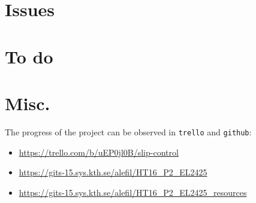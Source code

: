 \documentclass[oneside,12pt]{article}
\begin{document}
\section{Issues}



\section{To do}


\section{Misc.}

The progress of the project can be observed in \texttt{trello} and \texttt{github}:

\begin{itemize}
  \item \url{https://trello.com/b/uEP0jl0B/slip-control}
  \item \url{https://gits-15.sys.kth.se/alefil/HT16_P2_EL2425}
  \item \url{https://gits-15.sys.kth.se/alefil/HT16_P2_EL2425_resources}
\end{itemize}
\end{document}
